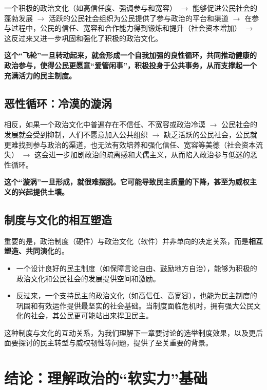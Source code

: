 一个积极的政治文化（如高信任度、强调参与和宽容） $\rightarrow$ 能够促进公民社会的蓬勃发展 $\rightarrow$ 活跃的公民社会组织为公民提供了参与政治的平台和渠道 $\rightarrow$ 在参与过程中，公民的信任、宽容和合作能力得到锻炼和提升（社会资本增加） $\rightarrow$ 这反过来又进一步巩固和强化了积极的政治文化。

\textbf{这个“飞轮”一旦转动起来，就会形成一个自我加强的良性循环，共同推动健康的政治参与，使得公民更愿意“爱管闲事”，积极投身于公共事务，从而支撑起一个充满活力的民主制度。}

\subsection{恶性循环：冷漠的漩涡}

相反，如果一个政治文化中普遍存在不信任、不宽容或政治冷漠 $\rightarrow$ 公民社会的发展就会受到抑制，人们不愿意加入公共组织 $\rightarrow$ 缺乏活跃的公民社会，公民就更难找到参与政治的渠道，也无法有效培养和强化信任、宽容等美德（社会资本流失） $\rightarrow$ 这会进一步加剧政治的疏离感和犬儒主义，从而陷入政治参与低迷的恶性循环。

\textbf{这个“漩涡”一旦形成，就很难摆脱。它可能导致民主质量的下降，甚至为威权主义的兴起提供土壤。}

\subsection{制度与文化的相互塑造}

重要的是，政治制度（硬件）与政治文化（软件）并非单向的决定关系，而是\textbf{相互塑造、共同演化}的。
\begin{itemize}
    \item 一个设计良好的民主制度（如保障言论自由、鼓励地方自治），能够为积极的政治文化和公民社会的发展提供空间和激励。
    \item 反过来，一个支持民主的政治文化（如高信任、高宽容），也能为民主制度的巩固和有效运作提供最坚实的社会基础。当制度面临危机时，拥有强大公民文化的社会，其公民更可能站出来捍卫民主。
\end{itemize}

这种制度与文化的互动关系，为我们理解下一章要讨论的选举制度效果，以及更后面要探讨的民主转型与威权韧性等问题，提供了至关重要的背景。

\hrulefill

\section{结论：理解政治的“软实力”基础}


